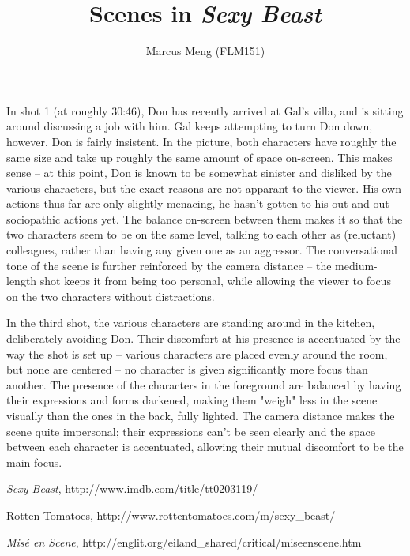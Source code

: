 \documentclass{article}
\title{Scenes in \emph{Sexy Beast}}
\author{Marcus Meng (FLM151)}
\begin{document}
\maketitle

In shot 1 (at roughly 30:46), Don has recently arrived at Gal's villa, and is sitting around discussing a job with him.
Gal keeps attempting to turn Don down, however, Don is fairly insistent.
In the picture, both characters have roughly the same size and take up roughly the same amount of space on-screen.
This makes sense -- at this point, Don is known to be somewhat sinister and disliked by the various characters, but the exact reasons are not apparant to the viewer.
His own actions thus far are only slightly menacing, he hasn't gotten to his out-and-out sociopathic actions yet.
The balance on-screen between them makes it so that the two characters seem to be on the same level, talking to each other as (reluctant) colleagues, rather than having any given one as an aggressor.
The conversational tone of the scene is further reinforced by the camera distance -- the medium-length shot keeps it from being too personal, while allowing the viewer to focus on the two characters without distractions.

In the third shot, the various characters are standing around in the kitchen, deliberately avoiding Don.
Their discomfort at his presence is accentuated by the way the shot is set up -- various characters are placed evenly around the room, but none are centered -- no character is given significantly more focus than another.
The presence of the characters in the foreground are balanced by having their expressions and forms darkened, making them "weigh" less in the scene visually than the ones in the back, fully lighted.
The camera distance makes the scene quite impersonal; their expressions can't be seen clearly and the space between each character is accentuated, allowing their mutual discomfort to be the main focus.

\begin{thebibliography}{9}

	\emph{Sexy Beast}, http://www.imdb.com/title/tt0203119/

	Rotten Tomatoes, http://www.rottentomatoes.com/m/sexy\_beast/

	\emph{Mis\'{e} en Scene}, http://englit.org/eiland\_shared/critical/miseenscene.htm

\end{thebibliography}
\end{document}
